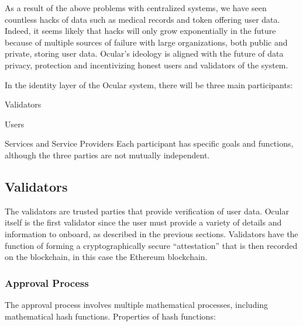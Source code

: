 \documentclass[a4paper]{article}
\let\tempone\itemize
\let\temptwo\enditemize
\renewenvironment{itemize}{\tempone\addtolength{\itemsep}{-5pt}}{\temptwo}
\begin{document}
As a result of the above problems with centralized systems, we have seen countless hacks of data such as medical records and token offering user data. Indeed, it seems likely that hacks will only grow exponentially in the future because of multiple sources of failure with large organizations, both public and private, storing user data. Ocular's ideology is aligned with the future of data privacy, protection and incentivizing honest users and validators of the system.

In the identity layer of the Ocular system, there will be three main participants:
\begin{itemize}
\item Validators
\item Users
\item Services and Service Providers
\end{itemize}
Each participant has specific goals and functions, although the three parties are not mutually independent. 
\subsection{Validators}
The validators are trusted parties that provide verification of user data. Ocular itself is the first validator since the user must provide a variety of details and information to onboard, as described in the previous sections. Validators have the function of forming a cryptographically secure ``attestation'' that is then recorded on the blockchain, in this case the Ethereum blockchain. 

\subsubsection*{Approval Process}
The approval process involves multiple mathematical processes, including mathematical hash functions. Properties of hash functions:
\end{document}
